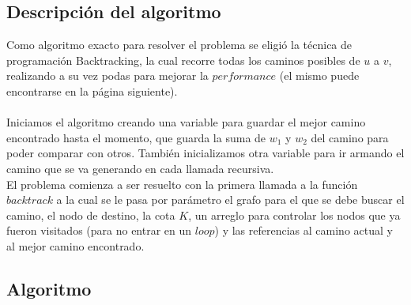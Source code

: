 \subsection{Descripci\'on del algoritmo}

Como algoritmo exacto para resolver el problema se eligi\'o la t\'ecnica de programaci\'on Backtracking, la cual recorre todas los caminos posibles de $u$ a $v$, realizando a su vez podas para mejorar la $performance$ (el mismo puede encontrarse en la p\'agina siguiente).\\\\

Iniciamos el algoritmo creando una variable para guardar el mejor camino encontrado hasta el momento, que guarda la suma de $w_{1}$ y $w_{2}$ del camino para poder comparar con otros. Tambi\'en inicializamos otra variable para ir armando el camino que se va generando en cada llamada recursiva.\\

El problema comienza a ser resuelto con la primera llamada a la funci\'on $backtrack$ a la cual se le pasa por par\'ametro el grafo para el que se debe buscar el camino, el nodo de destino, la cota $K$, un arreglo para controlar los nodos que ya fueron visitados (para no entrar en un $loop$) y las referencias al camino actual y al mejor camino encontrado.


\newpage
\subsection{Algoritmo}

